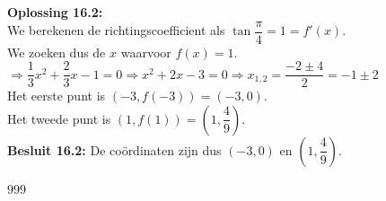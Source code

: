 \documentclass[a4paper]{article}
\begin{document}
\textbf{Oplossing 16.2:} \\

We berekenen de richtingscoefficient als $\tan \dfrac{\pi}{4} = 1 = f'(x)$. \\

We zoeken dus de $x$ waarvoor $f(x) = 1$. \\

$\Rightarrow \dfrac{1}{3}x^2 + \dfrac{2}{3}x - 1 = 0 \Rightarrow x^2 + 2x - 3 = 0 \Rightarrow x_{1,2} = \dfrac{-2 \pm 4}{2} = -1 \pm 2$ \\

Het eerste punt is $(-3, f(-3)) = (-3, 0)$. \\

Het tweede punt is $(1, f(1)) = \left(1, \dfrac{4}{9}\right)$. \\

\textbf{Besluit 16.2:} De coördinaten zijn dus $(-3, 0)$ en $\left(1, \dfrac{4}{9}\right)$. \\

\begin{thebibliography}{999}
\end{thebibliography}
\end{document}
